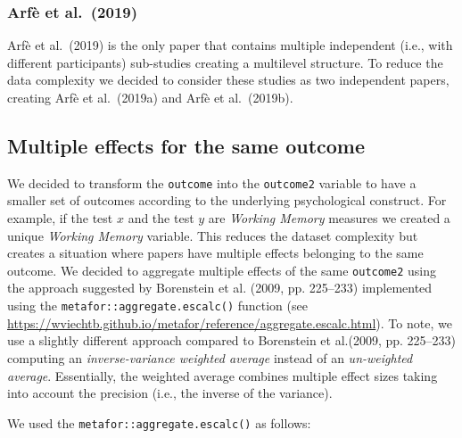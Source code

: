 \documentclass[
]{article}
\begin{document}
\hypertarget{arfe2019}{%
\subsubsection{Arfè et al.~(2019)}\label{arfe2019}}

Arfè et al.~(2019) is the only paper that contains multiple independent (i.e., with different participants) sub-studies creating a multilevel structure. To reduce the data complexity we decided to consider these studies as two independent papers, creating Arfè et al.~(2019a) and Arfè et al.~(2019b).

\hypertarget{aggregation}{%
\subsection{Multiple effects for the same outcome}\label{aggregation}}

We decided to transform the \texttt{outcome} into the \texttt{outcome2} variable to have a smaller set of outcomes according to the underlying psychological construct. For example, if the test \(x\) and the test \(y\) are \emph{Working Memory} measures we created a unique \emph{Working Memory} variable.
This reduces the dataset complexity but creates a situation where papers have multiple effects belonging to the same outcome. We decided to aggregate multiple effects of the same \texttt{outcome2} using the approach suggested by Borenstein et al. (2009, pp. 225--233) implemented using the \texttt{metafor::aggregate.escalc()} function (see \url{https://wviechtb.github.io/metafor/reference/aggregate.escalc.html}).
To note, we use a slightly different approach compared to Borenstein et al.(2009, pp. 225--233) computing an \emph{inverse-variance weighted average} instead of an \emph{un-weighted average}. Essentially, the weighted average combines multiple effect sizes taking into account the precision (i.e., the inverse of the variance).

We used the \texttt{metafor::aggregate.escalc()} as follows:

\small
\end{document}
